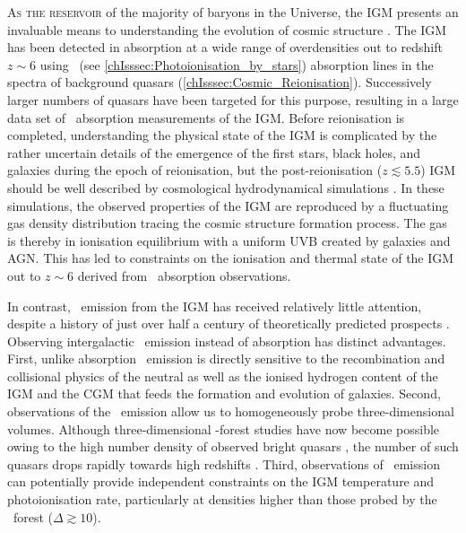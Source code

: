 \lettrine{A}{s the reservoir} of the majority of baryons in the Universe, the IGM presents an invaluable means to understanding the evolution of cosmic structure \citep{2009RvMP...81.1405M}. The IGM has been detected in absorption at a wide range of overdensities out to redshift $z \sim 6$ using  \lya\ (see \cref{chIsssec:Photoionisation_by_stars}) absorption lines in the spectra of background quasars (\cref{chIsssec:Cosmic_Reionisation}). Successively larger numbers of quasars have been targeted for this purpose, resulting in a large data set of \lya\ absorption measurements of the IGM. Before reionisation is completed, understanding the physical state of the IGM is complicated by the rather uncertain details of the emergence of the first stars, black holes, and galaxies during the epoch of reionisation, but the post-reionisation ($z \lesssim 5.5$) IGM should be well described by cosmological hydrodynamical simulations \citep{1994ApJ...437L...9C, 1996ApJ...457L..51H, 1999elss.conf..346W, 2017ApJ...837..106O, 2019MNRAS.486.4075O, 2015MNRAS.446.3697L, 2017MNRAS.464..897B}. In these simulations, the observed properties of the IGM are reproduced by a fluctuating gas density distribution tracing the cosmic structure formation process. The gas is thereby in ionisation equilibrium with a uniform UVB created by galaxies and AGN. This has led to constraints on the ionisation and thermal state of the IGM out to $z \sim 6$ \citep{1997ApJ...489....7R, 1999ApJ...511..521D, 2000MNRAS.318..817S, 2003MNRAS.342.1205M, 2008ApJ...688...85F, 2011MNRAS.410.1096B, 2012MNRAS.419.2880B, 2013MNRAS.436.1023B, 2017PhLB..773..258G, 2019ApJ...872...13W, 2019MNRAS.486..769K} derived from \lya\ absorption observations.

In contrast, \lya\ emission from the IGM has received relatively little attention, despite a history of just over half a century of theoretically predicted prospects \citep{1967ApJ...147..868P, 1987MNRAS.225P...1H, 1996ApJ...468..462G, 2001ApJ...562..605F, 2003ApJ...599L...1F, 2005ApJ...622....7F, 2005ApJ...628...61C, 2010ApJ...708.1048K, 2010ApJ...725..633F, 2012MNRAS.423..344R, 2013ApJ...763..132S, 2016MNRAS.462.1961S, 2017ApJ...848...52H, 2019MNRAS.489.2417A, 2020MNRAS.494.5439E}. Observing intergalactic \lya\ emission instead of absorption has distinct advantages. First, unlike absorption \lya\ emission is directly sensitive to the recombination and collisional physics of the neutral as well as the ionised hydrogen content of the IGM and the CGM that feeds the formation and evolution of galaxies. Second, observations of the \lya\ emission allow us to homogeneously probe three-dimensional volumes. Although three-dimensional \lya-forest studies have now become possible owing to the high number density of observed bright quasars \citep[see e.g.][]{2014MNRAS.440.2599C}, the number of such quasars drops rapidly towards high redshifts \citep{2019MNRAS.488.1035K}. Third, observations of \lya\ emission can potentially provide independent constraints on the IGM temperature and photoionisation rate, particularly at densities higher than those probed by the \lya\ forest ($\Delta \gtrsim 10$).

